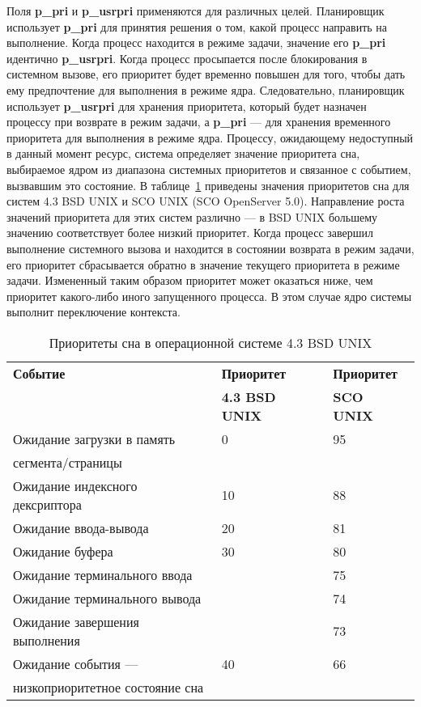 \documentclass{bmstu}
\begin{document}
Поля \textbf{p\_pri} и \textbf{p\_usrpri} применяются для различных целей. 
Планировщик использует \textbf{p\_pri} для принятия решения о том, какой процесс направить на выполнение. 
Когда процесс находится в режиме задачи, значение его \textbf{p\_pri} идентично \textbf{p\_usrpri}. 
Когда процесс просыпается после блокирования в системном вызове, его приоритет будет временно повышен для того, чтобы дать ему предпочтение для выполнения в режиме ядра. 
Следовательно, планировщик использует \textbf{p\_usrpri} для хранения приоритета, который будет назначен процессу при возврате в режим задачи, а \textbf{p\_pri} --- для хранения временного приоритета для выполнения в режиме ядра. 
Процессу, ожидающему недоступный в данный момент ресурс, система определяет значение приоритета сна, выбираемое ядром из диапазона системных приоритетов и связанное с событием, вызвавшим это состояние. 
В таблице~\ref{tab:bsd} приведены значения приоритетов сна для систем 4.3 BSD UNIX и SCO UNIX (SCO OpenServer 5.0). 
Направление роста значений приоритета для этих систем различно --- в BSD UNIX большему значению соответствует более низкий приоритет. 
Когда процесс завершил выполнение системного вызова и находится в состоянии возврата в режим задачи, его приоритет сбрасывается обратно в значение текущего приоритета в режиме задачи. 
Измененный таким образом приоритет может оказаться ниже, чем приоритет какого-либо иного запущенного процесса. 
В этом случае ядро системы выполнит переключение контекста.

\begin{table}[h]
\caption{Приоритеты сна в операционной системе 4.3 BSD UNIX}
\label{tab:bsd}
\begin{center}
\begin{tabular}{ | l | l | l |  }
\hline
			\textbf{Событие} & \textbf{Приоритет} & \textbf{Приоритет} \\ 
            & \textbf{4.3 BSD UNIX} & \textbf{SCO UNIX} \\ \hline
			Ожидание загрузки в память & 0 & 95 \\
            сегмента/страницы & & \\ \hline
			Ожидание индексного дексриптора & 10 & 88 \\ \hline
			Ожидание ввода-вывода & 20 & 81 \\ \hline
			Ожидание буфера & 30 & 80 \\ \hline
			Ожидание терминального ввода  & & 75 \\ \hline
			Ожидание терминального вывода  & & 74 \\ \hline
			Ожидание завершения выполнения & & 73 \\ \hline
			Ожидание события --- & 40 & 66 \\
            низкоприоритетное состояние сна & & \\ \hline
\end{tabular}
\end{center}
\end{table}
\end{document}
